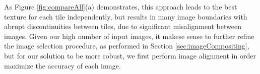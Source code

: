 \documentclass[]{spie}  %
\begin{document}
As Figure \ref{fig:compareAll}(a) demonstrates, this approach leads to
the best texture for each tile independently, but results in many
image boundaries with abrupt discontinuities between tiles, due to
significant misalignment between images. Given our high number of
input images, it makese sense to further refine the image selection
procedure, as performed in Section \ref{sec:imageCompositing}, but for
our solution to be more robust, we first perform image alignment in
order maximize the accuracy of each image.

\end{document}

